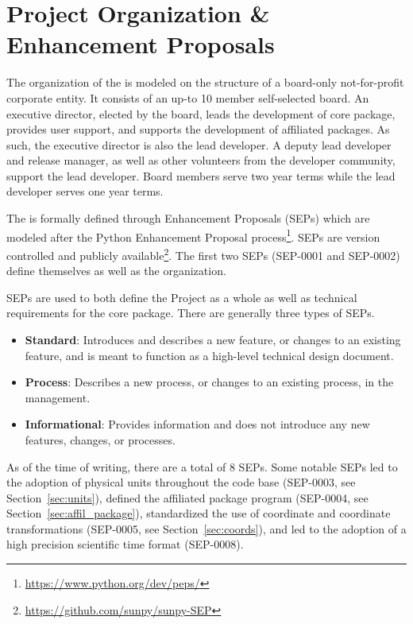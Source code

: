 \section{Project Organization \& Enhancement Proposals}

The organization of the \sunpyproj is modeled on the structure of a board-only not-for-profit corporate entity. 
It consists of an up-to 10 member self-selected board. 
An executive director, elected by the board, leads the development of \sunpy core package, provides user support, and supports the development of affiliated packages. 
As such, the executive director is also the \sunpy lead developer.
A deputy lead developer and release manager, as well as other volunteers from the developer community, support the lead developer.
Board members serve two year terms while the lead developer serves one year terms. 

The \sunpyproj is formally defined through \sunpy Enhancement Proposals (SEPs) which are modeled after the Python Enhancement Proposal process\footnote{\url{https://www.python.org/dev/peps/}}.
SEPs are version controlled and publicly available\footnote{\url{https://github.com/sunpy/sunpy-SEP}}. The first two SEPs (SEP-0001 and SEP-0002) define themselves as well as the \sunpy organization. 

SEPs are used to both define the Project as a whole as well as technical requirements for the \sunpypkg core package. 
There are generally three types of SEPs. 
\begin{itemize}
    \item \textbf{Standard}: Introduces and describes a new feature, or changes to an existing feature, and is meant to function as a high-level technical design document.
    \item \textbf{Process}: Describes a new process, or changes to an existing process, in the \sunpyproj management.
    \item \textbf{Informational}: Provides information and does not introduce any new features, changes, or processes.
\end{itemize}

As of the time of writing, there are a total of 8 SEPs. 
Some notable SEPs led to the adoption of physical units throughout the code base (SEP-0003, see Section~\ref{sec:units}), defined the affiliated package program (SEP-0004, see Section~\ref{sec:affil_package}), standardized the use of coordinate and coordinate transformations (SEP-0005, see Section~\ref{sec:coords}), and led to the adoption of a high precision scientific time format (SEP-0008).


